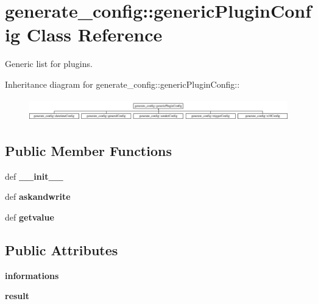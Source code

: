 \hypertarget{classgenerate__config_1_1genericPluginConfig}{
\section{generate\_\-config::genericPluginConfig Class Reference}
\label{classgenerate__config_1_1genericPluginConfig}
}
Generic list for plugins.  


Inheritance diagram for generate\_\-config::genericPluginConfig::\begin{figure}[H]
\begin{center}
\leavevmode
\includegraphics[height=0.961373cm]{classgenerate__config_1_1genericPluginConfig}
\end{center}
\end{figure}
\subsection*{Public Member Functions}
\begin{CompactItemize}
\item 
\hypertarget{classgenerate__config_1_1genericPluginConfig_6e5142c1890303123b37a9b1015601c8}{
def \textbf{\_\-\_\-init\_\-\_\-}}
\label{classgenerate__config_1_1genericPluginConfig_6e5142c1890303123b37a9b1015601c8}

\item 
\hypertarget{classgenerate__config_1_1genericPluginConfig_5e6843b1a07f91051930ac9ae93f4494}{
def \textbf{askandwrite}}
\label{classgenerate__config_1_1genericPluginConfig_5e6843b1a07f91051930ac9ae93f4494}

\item 
\hypertarget{classgenerate__config_1_1genericPluginConfig_aae7b874b8371f63fb170cb9f3682b12}{
def \textbf{getvalue}}
\label{classgenerate__config_1_1genericPluginConfig_aae7b874b8371f63fb170cb9f3682b12}

\end{CompactItemize}
\subsection*{Public Attributes}
\begin{CompactItemize}
\item 
\hypertarget{classgenerate__config_1_1genericPluginConfig_4d6143782994ef3d177b90f38f4512c4}{
\textbf{informations}}
\label{classgenerate__config_1_1genericPluginConfig_4d6143782994ef3d177b90f38f4512c4}

\item 
\hypertarget{classgenerate__config_1_1genericPluginConfig_e8a1d20ad1774f98d48f58f908a62216}{
\textbf{result}}
\label{classgenerate__config_1_1genericPluginConfig_e8a1d20ad1774f98d48f58f908a62216}

\end{CompactItemize}


